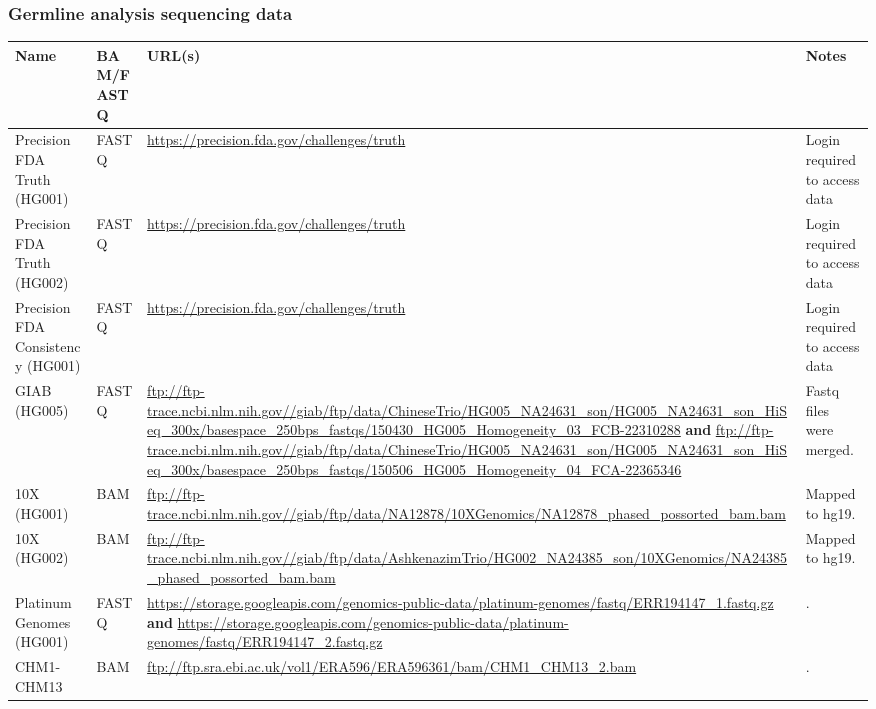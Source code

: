 \documentclass{article}
\begin{document}
\begin{landscape}
\subsubsection*{Germline analysis sequencing data}

\noindent\begin{tabularx}{\linewidth}{llXl}
    \toprule
       Name & BAM/FASTQ &   URL(s) & Notes  \\
    \midrule
    Precision FDA Truth (HG001) & FASTQ & \url{https://precision.fda.gov/challenges/truth} & Login required to access data \\
    Precision FDA Truth (HG002) & FASTQ & \url{https://precision.fda.gov/challenges/truth} & Login required to access data \\
    Precision FDA Consistency (HG001) & FASTQ & \url{https://precision.fda.gov/challenges/truth} & Login required to access data \\
    GIAB (HG005) & FASTQ & \url{ftp://ftp-trace.ncbi.nlm.nih.gov//giab/ftp/data/ChineseTrio/HG005_NA24631_son/HG005_NA24631_son_HiSeq_300x/basespace_250bps_fastqs/150430_HG005_Homogeneity_03_FCB-22310288} \textbf{and} \url{ftp://ftp-trace.ncbi.nlm.nih.gov//giab/ftp/data/ChineseTrio/HG005_NA24631_son/HG005_NA24631_son_HiSeq_300x/basespace_250bps_fastqs/150506_HG005_Homogeneity_04_FCA-22365346} &  Fastq files were merged. \\
    10X (HG001) & BAM & \url{ftp://ftp-trace.ncbi.nlm.nih.gov//giab/ftp/data/NA12878/10XGenomics/NA12878_phased_possorted_bam.bam} & Mapped to hg19. \\
    10X (HG002) & BAM & \url{ftp://ftp-trace.ncbi.nlm.nih.gov//giab/ftp/data/AshkenazimTrio/HG002_NA24385_son/10XGenomics/NA24385_phased_possorted_bam.bam} & Mapped to hg19. \\
    Platinum Genomes (HG001) & FASTQ &  \url{https://storage.googleapis.com/genomics-public-data/platinum-genomes/fastq/ERR194147_1.fastq.gz} \textbf{and} \url{https://storage.googleapis.com/genomics-public-data/platinum-genomes/fastq/ERR194147_2.fastq.gz} & .\\
    CHM1-CHM13 & BAM & \url{ftp://ftp.sra.ebi.ac.uk/vol1/ERA596/ERA596361/bam/CHM1_CHM13_2.bam} & . \\
    \bottomrule
\end{tabularx}
\end{landscape}
\newpage
\end{document}

